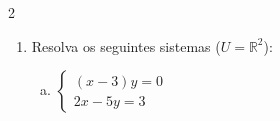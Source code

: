 \documentclass[a4paper,14pt]{article}
\begin{document}
\begin{multicols}{2}
\begin{enumerate}
\begin{enumerate}[a)]
	            \item $\begin{cases}
	            	xy = 0 \\
	            	x^2 + 4xy - y = 4
	            \end{cases}$ \\\\\\\\\\\\\\\\\\\\
                \item $\begin{cases}
                	ab = 1 \\
                	(a - 3)(b + 4) = 0
                \end{cases}$ \\\\\\\\\\\\\\\\\\\\\\\\\\\\\\\\\\
			\end{enumerate}
		    \item Resolva os seguintes sistemas ($U = \mathbb{R}^2$):
		    \begin{enumerate}[a)]
		    	\item $\begin{cases}
		    		(x - 3)y = 0 \\
		    		2x - 5y = 3
		    	\end{cases}$ \\\\\\\\\\\\\\\\\\\\\\\\

\end{enumerate}
\end{enumerate}
\end{multicols}
\end{document}

